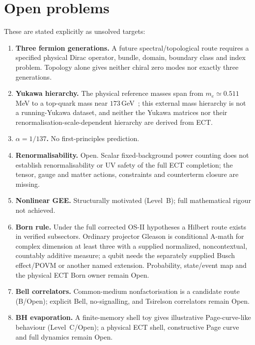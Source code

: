 \documentclass[11pt,a4paper]{article}
\begin{document}
\section{Open problems}

These are stated explicitly as unsolved targets:

\begin{enumerate}
\item \textbf{Three fermion generations.} A future spectral/topological route requires a specified physical Dirac operator, bundle, domain, boundary class and index problem.  Topology alone gives neither chiral zero modes nor exactly three generations.

\item \textbf{Yukawa hierarchy.} The physical reference masses span from
$m_e\simeq0.511$\,MeV to a top-quark mass near
$173$\,GeV~\cite{ParticleDataGroup2022}; this external mass hierarchy is not
a running-Yukawa dataset, and neither the Yukawa matrices nor their
renormalisation-scale-dependent hierarchy are derived from ECT.

\item \textbf{$\alpha = 1/137$.} No first-principles prediction.

\item \textbf{Renormalisability.} Open. Scalar fixed-background power counting does not establish renormalisability or UV safety of the full ECT completion; the tensor, gauge and matter actions, constraints and counterterm closure are missing.

\item \textbf{Nonlinear GEE.} Structurally motivated (Level~B); full mathematical rigour not achieved.

\item \textbf{Born rule.} Under the full corrected OS-II hypotheses a Hilbert route exists in verified subsectors.  Ordinary projector Gleason is conditional A-math for complex dimension at least three with a supplied normalized, noncontextual, countably additive measure; a qubit needs the separately supplied Busch effect/POVM or another named extension.  Probability, state/event map and the physical ECT Born owner remain Open.

\item \textbf{Bell correlators.} Common-medium nonfactorisation is a candidate route (B/Open); explicit Bell, no-signalling, and Tsirelson correlators remain Open.

\item \textbf{BH evaporation.} A finite-memory shell toy gives illustrative Page-curve-like behaviour (Level~C/Open); a physical ECT shell, constructive Page curve and full dynamics remain Open.


\end{enumerate}
\end{document}
